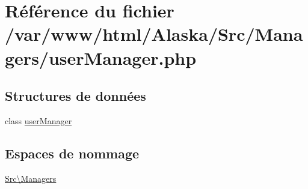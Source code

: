 \hypertarget{user_manager_8php}{}\section{Référence du fichier /var/www/html/\+Alaska/\+Src/\+Managers/user\+Manager.php}
\label{user_manager_8php}
\subsection*{Structures de données}
\begin{DoxyCompactItemize}
\item 
class \hyperlink{class_src_1_1_managers_1_1user_manager}{user\+Manager}
\end{DoxyCompactItemize}
\subsection*{Espaces de nommage}
\begin{DoxyCompactItemize}
\item 
 \hyperlink{namespace_src_1_1_managers}{Src\textbackslash{}\+Managers}
\end{DoxyCompactItemize}
